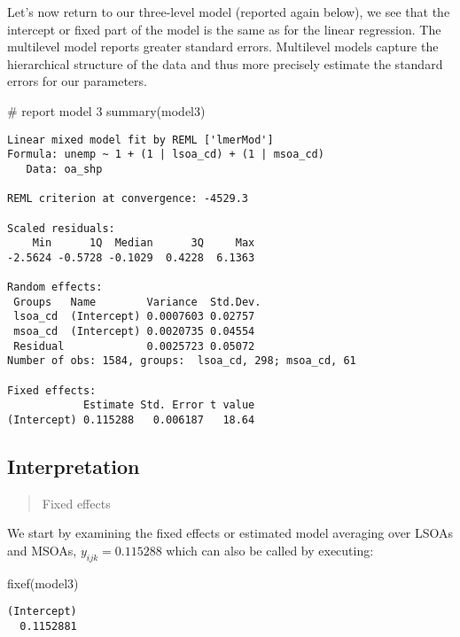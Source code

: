 \documentclass[
  letterpaper,
  krantz2]{style/krantz}
\newenvironment{Shaded}{\begin{snugshade}}{\end{snugshade}}
\newcommand{\CommentTok}[1]{\textcolor[rgb]{0.37,0.37,0.37}{#1}}
\newcommand{\FunctionTok}[1]{\textcolor[rgb]{0.28,0.35,0.67}{#1}}
\newcommand{\NormalTok}[1]{\textcolor[rgb]{0.00,0.23,0.31}{#1}}
\begin{document}
Let's now return to our three-level model (reported again below), we see
that the intercept or fixed part of the model is the same as for the
linear regression. The multilevel model reports greater standard errors.
Multilevel models capture the hierarchical structure of the data and
thus more precisely estimate the standard errors for our parameters.

\begin{Shaded}
\begin{Highlighting}[]
\CommentTok{\# report model 3}
\FunctionTok{summary}\NormalTok{(model3)}
\end{Highlighting}
\end{Shaded}

\begin{verbatim}
Linear mixed model fit by REML ['lmerMod']
Formula: unemp ~ 1 + (1 | lsoa_cd) + (1 | msoa_cd)
   Data: oa_shp

REML criterion at convergence: -4529.3

Scaled residuals: 
    Min      1Q  Median      3Q     Max 
-2.5624 -0.5728 -0.1029  0.4228  6.1363 

Random effects:
 Groups   Name        Variance  Std.Dev.
 lsoa_cd  (Intercept) 0.0007603 0.02757 
 msoa_cd  (Intercept) 0.0020735 0.04554 
 Residual             0.0025723 0.05072 
Number of obs: 1584, groups:  lsoa_cd, 298; msoa_cd, 61

Fixed effects:
            Estimate Std. Error t value
(Intercept) 0.115288   0.006187   18.64
\end{verbatim}

\hypertarget{interpretation}{%
\subsection{Interpretation}\label{interpretation}}

\begin{quote}
Fixed effects
\end{quote}

We start by examining the fixed effects or estimated model averaging
over LSOAs and MSOAs, \(y_{ijk} = 0.115288\) which can also be called by
executing:

\begin{Shaded}
\begin{Highlighting}[]
\FunctionTok{fixef}\NormalTok{(model3)}
\end{Highlighting}
\end{Shaded}

\begin{verbatim}
(Intercept) 
  0.1152881 
\end{verbatim}
\end{document}
